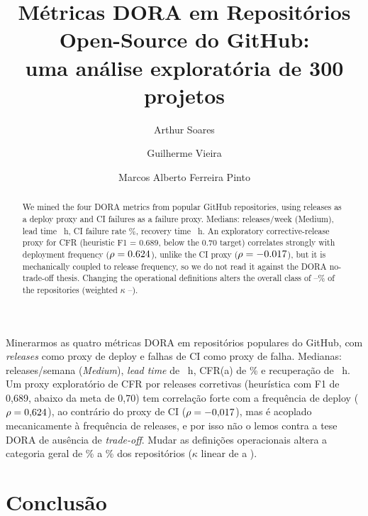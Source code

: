 \documentclass[12pt]{article}
\title{Métricas DORA em Repositórios Open-Source do GitHub:\\
uma análise exploratória de 300 projetos}
\author{Arthur Soares\inst{1} \and Guilherme Vieira\inst{1} \and Marcos Alberto Ferreira Pinto\inst{1}}
\begin{document}
\maketitle

\begin{abstract}
We mined the four DORA metrics from \NEnTotal{} popular GitHub repositories, using releases as a deploy
proxy and CI failures as a failure proxy. Medians: \NEnDfMed{} releases/week (Medium), lead time
\NEnLtaMed{}~h, CI failure rate \NEnCfraMed\%, recovery time \NEnRecMed{}~h. An exploratory
corrective-release proxy for CFR (heuristic F1 = 0.689, below the 0.70 target) correlates strongly
with deployment frequency ($\rho = 0.624$), unlike the CI proxy ($\rho = -0.017$), but it is
mechanically coupled to release frequency, so we do not read it against the DORA no-trade-off thesis.
Changing the operational definitions alters the overall class of \NEnSensUmTresPct--\NEnSensUmDoisPct\% of
the repositories (weighted $\kappa$ \NEnSensUmDoisKappa--\NEnSensUmTresKappa).
\end{abstract}

\begin{resumo}
Minerarmos as quatro métricas DORA em \NTotal{} repositórios populares do GitHub, com \textit{releases}
como proxy de deploy e falhas de CI como proxy de falha. Medianas: \NDfMed{} releases/semana (\textit{Medium}),
\textit{lead time} de \NLtaMed{}~h, CFR(a) de \NCfraMed\% e recuperação de \NRecMed{}~h. Um proxy exploratório
de CFR por releases corretivas (heurística com F1 de 0,689, abaixo da meta de 0,70) tem correlação forte com a
frequência de deploy ($\rho = 0{,}624$), ao contrário do proxy de CI ($\rho = -0{,}017$), mas é acoplado
mecanicamente à frequência de releases, e por isso não o lemos contra a tese DORA de ausência de
\textit{trade-off}. Mudar as definições operacionais altera a categoria geral de \NSensUmTresPct\% a
\NSensUmDoisPct\% dos repositórios ($\kappa$ linear de \NSensUmDoisKappa{} a \NSensUmTresKappa).
\end{resumo}










\section{Conclusão}
\end{document}
